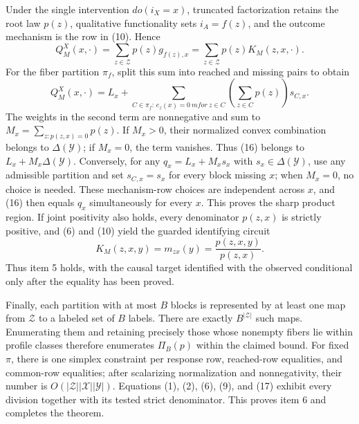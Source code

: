 Under the single intervention \(do(i_X=x)\), truncated factorization
retains the root law \(p(z)\), qualitative functionality sets
\(i_A=f(z)\), and the outcome mechanism is the row in (10).  Hence
\[
 Q_M^X(x,\cdot)
 =\sum_{z\in\mathcal Z}p(z)g_{f(z),x}
 =\sum_{z\in\mathcal Z}p(z)K_M(z,x,\cdot).
 \tag{15}
\]
For the fiber partition \(\pi_f\), split this sum into reached and
missing pairs to obtain
\[
 Q_M^X(x,\cdot)
 =L_x+
 \sum_{C\in\pi_f:\,e_z(x)=0\ {
m for}\ z\in C}
 \left(\sum_{z\in C}p(z)\right)s_{C,x}.
 \tag{16}
\]
The weights in the second term are nonnegative and sum to
\(M_x=\sum_{z:p(z,x)=0}p(z)\).  If \(M_x>0\), their normalized convex
combination belongs to \(\Delta(\mathcal Y)\); if \(M_x=0\), the term
vanishes.  Thus (16) belongs to
\(L_x+M_x\Delta(\mathcal Y)\).  Conversely, for any
\(q_x=L_x+M_xs_x\) with \(s_x\in\Delta(\mathcal Y)\), use any
admissible partition and set \(s_{C,x}=s_x\) for every block missing
\(x\); when \(M_x=0\), no choice is needed.  These mechanism-row choices
are independent across \(x\), and (16) then equals \(q_x\)
simultaneously for every \(x\).  This proves the sharp product region.
If joint positivity also holds, every denominator \(p(z,x)\) is
strictly positive, and (6) and (10) yield the guarded identifying circuit
\[
 K_M(z,x,y)=m_{zx}(y)=\frac{p(z,x,y)}{p(z,x)}.
 \tag{17}
\]
Thus item 5 holds, with the causal target identified with the observed
conditional only after the equality has been proved.

Finally, each partition with at most \(B\) blocks is represented by at
least one map from \(\mathcal Z\) to a labeled set of \(B\) labels.
There are exactly \(B^{\lvert\mathcal Z\rvert}\) such maps.  Enumerating
them and retaining precisely those whose nonempty fibers lie within
profile classes therefore enumerates \(\Pi_B(p)\) within the claimed
bound.  For fixed \(\pi\), there is one simplex constraint per response
row, reached-row equalities, and common-row equalities; after scalarizing
normalization and nonnegativity, their number is
\(O(\lvert\mathcal Z\rvert\lvert\mathcal X\rvert
\lvert\mathcal Y\rvert)\).  Equations (1), (2), (6), (9), and (17)
exhibit every division together with its tested strict denominator.
This proves item 6 and completes the theorem.
